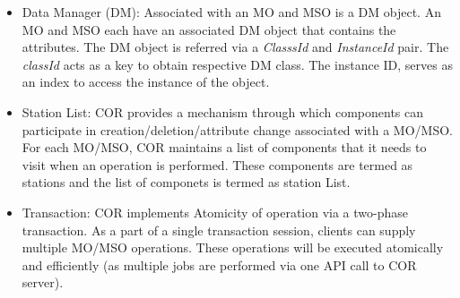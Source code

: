 \begin{Desc}
\begin{itemize}
\item Data Manager (DM): Associated with an MO and MSO is a DM object. An MO and MSO each have an associated DM object that contains the attributes. The DM object is referred via a {\em Classs\-Id\/} and {\em Instance\-Id\/} pair. The {\em class\-Id\/} acts as a key to obtain respective DM class. The instance ID, serves as an index to access the instance of the object.\end{itemize}
\begin{itemize}
\item Station List: COR provides a mechanism through which components can participate in creation/deletion/attribute change associated with a MO/MSO. For each MO/MSO, COR maintains a list of components that it needs to visit when an operation is performed. These components are termed as stations and the list of componets is termed as station List.\end{itemize}
\begin{itemize}
\item Transaction: COR implements Atomicity of operation via a two-phase transaction. As a part of a single transaction session, clients can supply multiple MO/MSO operations. These operations will be executed atomically and efficiently (as multiple jobs are performed via one API call to COR server).\end{itemize}
\end{Desc}
